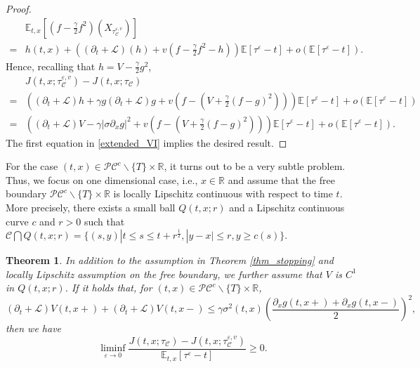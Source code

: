 \documentclass[11pt]{article}
\newtheorem{theorem}{Theorem}[section]
\begin{document}
\begin{proof}
\begin{equation*}
\begin{split}
&\mathbb E_{t,x}\left[(f-\frac{\gamma}{2}f^2)(X_{\tau^{\varepsilon,v}_{\mathcal C}}) \right]\\
=&h(t,x)+\left((\partial_t+\mathcal L)(h)+v(f-\frac{\gamma}{2}f^2-h)\right)\mathbb E\left[\tau^{\varepsilon}-t\right]+o(\mathbb E\left[\tau^{\varepsilon}-t\right]).
\end{split}
\end{equation*}
Hence, recalling that $h=V-\frac\gamma2 g^2$,
\begin{equation*}
\begin{split}
&J(t,x;\tau_{\mathcal C}^{\varepsilon,v})-J(t,x;\tau_{\mathcal C})\\
=&((\partial_t +\mathcal L)h+\gamma g(\partial_t +\mathcal L)g+v(f-(V+\frac{\gamma}{2}(f-g)^2)))\mathbb E[\tau^{\varepsilon}-t]+o(\mathbb E[\tau^{\varepsilon}-t])\\
=&((\partial_t +\mathcal L)V-\gamma|\sigma \partial_x g|^2+v(f-(V+\frac{\gamma}{2}(f-g)^2)))\mathbb E[\tau^{\varepsilon}-t]+o(\mathbb E[\tau^{\varepsilon}-t]).
\end{split}
\end{equation*}
The first equation in \eqref{extended_VI} implies the desired result.
\end{proof}
For the case $(t,x) \in \mathcal P\mathcal C^c\backslash\{T\}\times\mathbb R$,  it turns out to be a very subtle problem. Thus, we focus on one dimensional case, i.e., $x\in \mathbb R$ and assume that the free boundary $\mathcal P\mathcal C^c\backslash\{T\}\times\mathbb R$ is locally Lipschitz continuous  with respect to time $t$. More precisely, there exists a small ball $Q(t,x;r)$ and a Lipschitz continuous curve $c$  and $r>0$ such that  $\mathcal C \bigcap Q(t,x;r)=\{(s,y)|t \le s \le t+r^{\frac12},|y-x|\le r, y\ge c(s)\}$.
\begin{theorem} \label{thm_stopping1}
In addition to the assumption in Theorem \ref{thm_stopping} and locally Lipschitz assumption on the free boundary, we further assume 
that $V$ is $C^1$ in $Q(t,x;r)$. If it holds that, for $(t,x) \in\mathcal P\mathcal C^c\backslash\{T\}\times\mathbb R$, 
\begin{equation}\label{ineq_boundary}
(\partial_t+\mathcal L )V(t,x+)+(\partial_t+\mathcal L )V(t,x-)\le \gamma \sigma^2(t,x)\left(\frac{\partial_x g(t,x+)+\partial_x g(t,x-)}{2}\right)^2,
\end{equation}
then we  have  
$$
\liminf_{\varepsilon \rightarrow 0}\frac{J(t,x;\tau_{\mathcal C})-J(t,x;\tau_{\mathcal C}^{\varepsilon,v})}{\mathbb E_{t,x}[\tau^{\varepsilon}-t]}\ge 0.
$$
\end{theorem}
\end{document}

